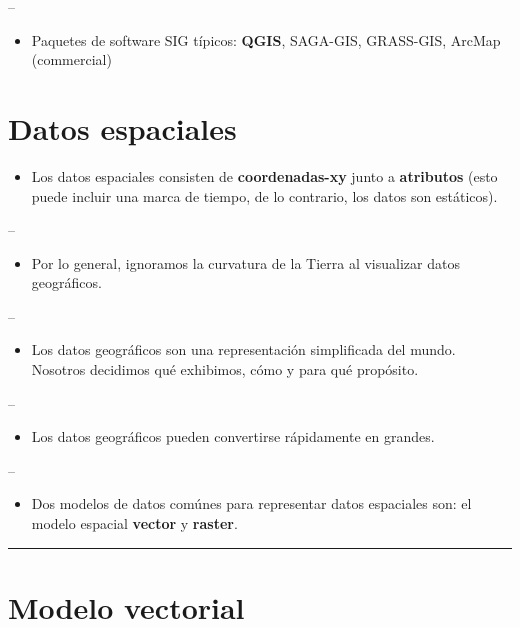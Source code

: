 \documentclass[]{article}
\providecommand{\tightlist}{%
  \setlength{\itemsep}{0pt}\setlength{\parskip}{0pt}}
\begin{document}
--

\begin{itemize}
\tightlist
\item
  Paquetes de software SIG típicos: \textbf{QGIS}, SAGA-GIS, GRASS-GIS,
  ArcMap (commercial)
\end{itemize}

\section{Datos espaciales}\label{datos-espaciales}

\begin{itemize}
\tightlist
\item
  Los datos espaciales consisten de \textbf{coordenadas-xy} junto a
  \textbf{atributos} (esto puede incluir una marca de tiempo, de lo
  contrario, los datos son estáticos).
\end{itemize}

--

\begin{itemize}
\tightlist
\item
  Por lo general, ignoramos la curvatura de la Tierra al visualizar
  datos geográficos.
\end{itemize}

--

\begin{itemize}
\tightlist
\item
  Los datos geográficos son una representación simplificada del mundo.
  Nosotros decidimos qué exhibimos, cómo y para qué propósito.
\end{itemize}

--

\begin{itemize}
\tightlist
\item
  Los datos geográficos pueden convertirse rápidamente en grandes.
\end{itemize}

--

\begin{itemize}
\tightlist
\item
  Dos modelos de datos comúnes para representar datos espaciales son: el
  modelo espacial \textbf{vector} y \textbf{raster}.
\end{itemize}

\begin{center}\rule{0.5\linewidth}{\linethickness}\end{center}

\section{Modelo vectorial}\label{modelo-vectorial}
\end{document}

